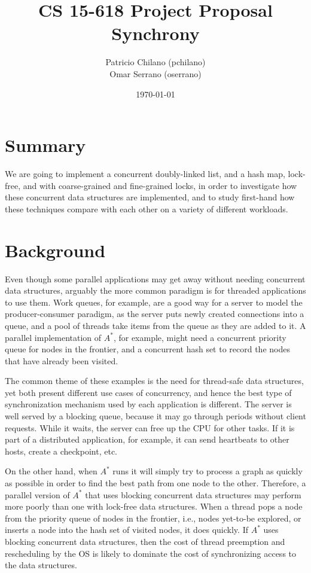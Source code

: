 \documentclass[11pt]{article}
\title{\vspace{-25pt}
\huge CS 15-618 Project Proposal \\
\huge Synchrony
}
\author{
    Patricio Chilano (pchilano) \\
    Omar Serrano (oserrano)
}
\date{\today}
\begin{document}


\maketitle

\section*{Summary}
We are going to implement a concurrent doubly-linked list, and a hash map,
lock-free, and with coarse-grained and fine-grained locks, in order to
investigate how these concurrent data structures are implemented, and to study
first-hand how these techniques compare with each other on a variety of
different workloads.

\section*{Background}
Even though some parallel applications may get away without needing concurrent
data structures, arguably the more common paradigm is for threaded applications
to use them. Work queues, for example, are a good way for a server to model the
producer-consumer paradigm, as the server puts newly created connections into a
queue, and a pool of threads take items from the queue as they are added to it.
A parallel implementation of $A^*$, for example, might need a concurrent
priority queue for nodes in the frontier, and a concurrent hash set to record
the nodes that have already been visited.

The common theme of these examples is the need for thread-safe data structures,
yet both present different use cases of concurrency, and hence the best type of
synchronization mechanism used by each application is different. The server is
well served by a blocking queue, because it may go through periods without
client requests. While it waits, the server can free up the CPU for other tasks.
If it is part of a distributed application, for example, it can send heartbeats
to other hosts, create a checkpoint, etc.

On the other hand, when $A^*$ runs it will simply try to process a graph as
quickly as possible in order to find the best path from one node to the other.
Therefore, a parallel version of $A^*$ that uses blocking concurrent data
structures may perform more poorly than one with lock-free data structures. When
a thread pops a node from the priority queue of nodes in the frontier, i.e.,
nodes yet-to-be explored, or inserts a node into the hash set of visited nodes,
it does quickly. If $A^*$ uses blocking concurrent data structures, then the
cost of thread preemption and rescheduling by the OS is likely to dominate the
cost of synchronizing access to the data structures.
\end{document}
